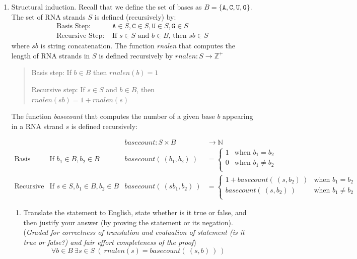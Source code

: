 \documentclass[12pt, oneside]{article}
\newcommand{\A}[0]{\texttt{A}}
\newcommand{\C}[0]{\texttt{C}}
\newcommand{\G}[0]{\texttt{G}}
\newcommand{\U}[0]{\texttt{U}}
\begin{document}
\begin{enumerate}[labelindent=0pt, leftmargin=0pt]
\begin{enumerate}
    \end{enumerate}
    
    \item Structural induction. Recall that we define the set of bases as $B  =  \{ \A, \C, \U, \G \}$.
The set of RNA strands $S$ is defined (recursively) by:
\[
\begin{array}{ll}
\textrm{Basis Step: } & \A \in S, \C \in S, \U \in S, \G \in S \\
\textrm{Recursive Step: } & \textrm{If } s \in S\textrm{ and }b \in B \textrm{, then }sb \in S
\end{array}
\]
where $sb$ is string concatenation. 
The function \textit{rnalen} that computes the length of RNA strands in $S$ is defined recursively by
$rnalen: S  \to \mathbb{Z}^+$


\begin{quote}
Basis step: If $b \in B$ then $rnalen(b)  = 1$

Recursive step: If $s \in S$ and $b \in B$, then $rnalen(sb)  = 1 + rnalen(s)$
\end{quote}

The function \textit{basecount} that computes the number of a given base 
$b$ appearing in a RNA strand $s$ is defined recursively:
    
\[
\begin{array}{llll}
& & \textit{basecount} : S \times B & \to \mathbb{N} \\
\textrm{Basis Step:} &  \textrm{If } b_1 \in B, b_2 \in B & \textit{basecount}(~(b_1, b_2)~) & =
        \begin{cases}
            1 & \textrm{when } b_1 = b_2 \\
            0 & \textrm{when } b_1 \neq b_2 \\
        \end{cases} \\
\textrm{Recursive Step:} & \textrm{If } s \in S, b_1 \in B, b_2 \in B &\textit{basecount}(~(s b_1, b_2)~) & =
        \begin{cases}
            1 + \textit{basecount}(~(s, b_2)~) & \textrm{when } b_1 = b_2 \\
            \textit{basecount}(~(s, b_2)~) & \textrm{when } b_1 \neq b_2 \\
        \end{cases}
\end{array}
\]
\begin{enumerate}
\item 
Translate the statement to English, state whether is it true or false, and then justify your answer (by proving the statement or its negation).
({\it Graded for correctness of translation and evaluation of statement (is it true or false?) 
    and fair effort completeness of the proof}) 
$$\forall b \in B ~\exists s \in S ~(~rnalen(s) = basecount(~(s,b)~)~)$$


\end{enumerate}
\end{enumerate}
\end{document}
